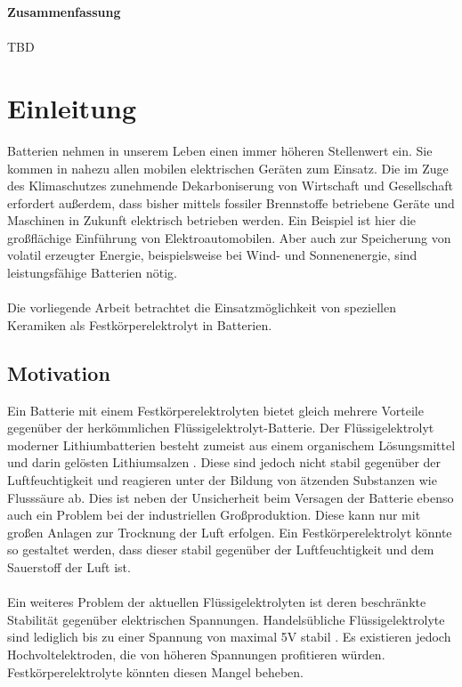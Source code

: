\documentclass[a4paper, 11pt, headsepline,footsepline,twoside,abstract]{scrbook}
\begin{document}
\newpage

\textbf{\Large{Zusammenfassung}}
\\\\
TBD
\pagestyle{toc}
\renewcommand*{\chapterpagestyle}{toc} %
\tableofcontents
{} 
\newpage
\cleardoubleemptypage
\pagestyle{normal}
\renewcommand*{\chapterpagestyle}{plain}
\setcounter{page}{1}
\chapter{Einleitung}
Batterien nehmen in unserem Leben einen immer höheren Stellenwert ein. Sie kommen in nahezu allen mobilen elektrischen Geräten zum Einsatz. Die im Zuge des Klimaschutzes zunehmende Dekarboniserung von Wirtschaft und Gesellschaft erfordert außerdem, dass bisher mittels fossiler Brennstoffe betriebene Geräte und Maschinen in Zukunft elektrisch betrieben werden. Ein Beispiel ist hier die großflächige Einführung von Elektroautomobilen. Aber auch zur Speicherung von volatil erzeugter Energie, beispielsweise bei Wind- und Sonnenenergie, sind leistungsfähige Batterien nötig.
\\\\
Die vorliegende Arbeit betrachtet die Einsatzmöglichkeit von speziellen Keramiken als Festkörperelektrolyt in Batterien.
\section{Motivation}
Ein Batterie mit einem Festkörperelektrolyten bietet gleich mehrere Vorteile gegenüber der herkömmlichen Flüssigelektrolyt-Batterie. Der Flüssigelektrolyt moderner Lithiumbatterien besteht zumeist aus einem organischem Lösungsmittel und darin gelösten Lithiumsalzen \cite{xu2004nonaqueous}. Diese sind jedoch nicht stabil gegenüber der Luftfeuchtigkeit und reagieren unter der Bildung von ätzenden Substanzen wie Flusssäure ab. Dies ist neben der Unsicherheit beim Versagen der Batterie ebenso auch ein Problem bei der industriellen Großproduktion. Diese kann nur mit großen Anlagen zur Trocknung der Luft erfolgen. Ein Festkörperelektrolyt könnte so gestaltet werden, dass dieser stabil gegenüber der Luftfeuchtigkeit und dem Sauerstoff der Luft ist.
\\\\
Ein weiteres Problem der aktuellen Flüssigelektrolyten ist deren beschränkte Stabilität gegenüber elektrischen Spannungen. Handelsübliche Flüssigelektrolyte sind lediglich bis zu einer Spannung von maximal 5V stabil \cite{tarascon1994new}. Es existieren jedoch Hochvoltelektroden, die von höheren Spannungen profitieren würden. Festkörperelektrolyte könnten diesen Mangel beheben.
\end{document}
